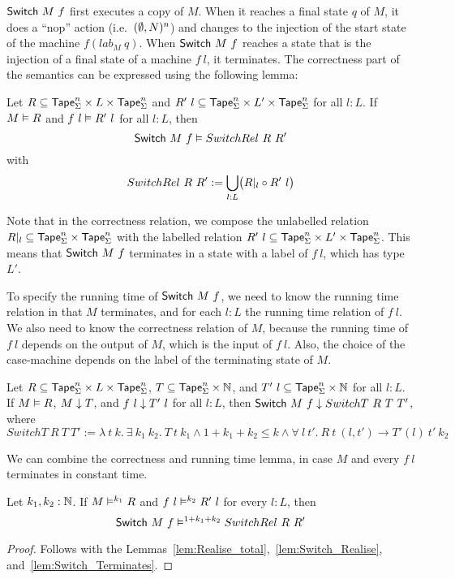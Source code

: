 $\mathsf{Switch}~M~f$ first executes a copy of $M$.  When it reaches a final state $q$ of $M$, it does a ``nop'' action (i.e.\ $(\emptyset,N)^n$) and changes
to the injection of the start state of the machine $f(lab_M~q)$.  When $\mathsf{Switch}~M~f$ reaches a state that is the injection of a final state of a
machine $f~l$, it terminates.  The correctness part of the semantics can be expressed using the following lemma:

\begin{lemma}
  \label{lem:Switch_Realise}
  Let $R \subseteq \mathsf{Tape}_\Sigma^n \times L \times \mathsf{Tape}_\Sigma^n$ and $R'~l \subseteq \mathsf{Tape}_\Sigma^n \times L' \times \mathsf{Tape}_\Sigma^n$ for all $l:L$.
  If $M \mathrel{\vDash} R$ and $f~l \mathrel{\vDash} R'~l$ for all $l:L$, then
  \[
    \mathsf{Switch}~M~f \mathrel{\vDash} SwitchRel~R~R'
  \]
  with
  \[
    SwitchRel~R~R' := \bigcup_{l:L} \bigl( R{|}_{l} \circ R'~l \bigr)
  \]
\end{lemma}

Note that in the correctness relation, we compose the unlabelled relation $R {|}_{l} \subseteq \mathsf{Tape}_\Sigma^n \times \mathsf{Tape}_\Sigma^n$ with the labelled
relation $R'~l \subseteq \mathsf{Tape}_\Sigma^n \times L' \times \mathsf{Tape}_\Sigma^n$.  This means that $\mathsf{Switch}~M~f$ terminates in a state with a label of $f~l$,
which has type $L'$.

To specify the running time of $\mathsf{Switch}~M~f$, we need to know the running time relation in that $M$ terminates, and for each $l:L$ the running
time relation of $f~l$.  We also need to know the correctness relation of $M$, because the running time of $f~l$ depends on the output of $M$, which
is the input of $f~l$.  Also, the choice of the case-machine depends on the label of the terminating state of $M$.

\begin{lemma}
  \label{lem:Switch_Terminates}
  Let $R \subseteq \mathsf{Tape}_\Sigma^n \times L \times \mathsf{Tape}_\Sigma^n$, $T \subseteq \mathsf{Tape}_\Sigma^n \times \mathbb{N}$, and
  $T'~l \subseteq \mathsf{Tape}_\Sigma^n \times \mathbb{N}$ for all $l:L$.  If $M \mathrel{\vDash} R$, $M \mathrel{\downarrow} T$, and $f~l \mathrel{\downarrow} T'~l$ for all $l:L$, then
  $\mathsf{Switch}~M~f \mathrel{\downarrow} SwitchT~R~T~T'$, where
  \[
    SwitchT~R~T~T' :=
    \lambda~t~k.~ \exists~k_1~k_2.~T~t~k_1 \land 1+k_1+k_2 \le k \land
      \forall~l~t'.~ R~t~(l,t') \rightarrow T'(l)~t'~k_2
  \]
\end{lemma}

We can combine the correctness and running time lemma, in case $M$ and every $f~l$ terminates in constant time.
\begin{lemma}
  \label{lem:Switch_RealiseIn}
  Let $k_1, k_2:\mathbb{N}$.
  If $M \mathrel{\vDash^{k_1}} R$ and $f~l \mathrel{\vDash^{k_2}} R'~l$ for every $l:L$, then
  \[ \mathsf{Switch}~M~f \mathrel{\vDash^{1+k_1+k_2}} SwitchRel~R~R' \]
\end{lemma}
\begin{proof}
  Follows with the Lemmas~\ref{lem:Realise_total},~\ref{lem:Switch_Realise}, and~\ref{lem:Switch_Terminates}.
\end{proof}


